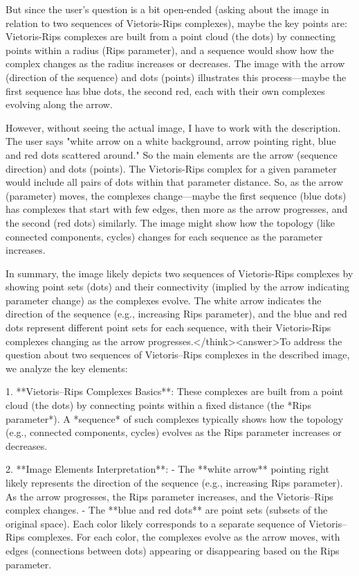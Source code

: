 But since the user's question is a bit open-ended (asking about the image in relation to two sequences of Vietoris-Rips complexes), maybe the key points are: Vietoris-Rips complexes are built from a point cloud (the dots) by connecting points within a radius (Rips parameter), and a sequence would show how the complex changes as the radius increases or decreases. The image with the arrow (direction of the sequence) and dots (points) illustrates this process—maybe the first sequence has blue dots, the second red, each with their own complexes evolving along the arrow.

However, without seeing the actual image, I have to work with the description. The user says "white arrow on a white background, arrow pointing right, blue and red dots scattered around." So the main elements are the arrow (sequence direction) and dots (points). The Vietoris-Rips complex for a given parameter would include all pairs of dots within that parameter distance. So, as the arrow (parameter) moves, the complexes change—maybe the first sequence (blue dots) has complexes that start with few edges, then more as the arrow progresses, and the second (red dots) similarly. The image might show how the topology (like connected components, cycles) changes for each sequence as the parameter increases.

In summary, the image likely depicts two sequences of Vietoris-Rips complexes by showing point sets (dots) and their connectivity (implied by the arrow indicating parameter change) as the complexes evolve. The white arrow indicates the direction of the sequence (e.g., increasing Rips parameter), and the blue and red dots represent different point sets for each sequence, with their Vietoris-Rips complexes changing as the arrow progresses.</think><answer>To address the question about two sequences of Vietoris–Rips complexes in the described image, we analyze the key elements:  

1. **Vietoris–Rips Complexes Basics**: These complexes are built from a point cloud (the dots) by connecting points within a fixed distance (the *Rips parameter*). A *sequence* of such complexes typically shows how the topology (e.g., connected components, cycles) evolves as the Rips parameter increases or decreases.  

2. **Image Elements Interpretation**:  
   - The **white arrow** pointing right likely represents the direction of the sequence (e.g., increasing Rips parameter). As the arrow progresses, the Rips parameter increases, and the Vietoris–Rips complex changes.  
   - The **blue and red dots** are point sets (subsets of the original space). Each color likely corresponds to a separate sequence of Vietoris–Rips complexes. For each color, the complexes evolve as the arrow moves, with edges (connections between dots) appearing or disappearing based on the Rips parameter.  

